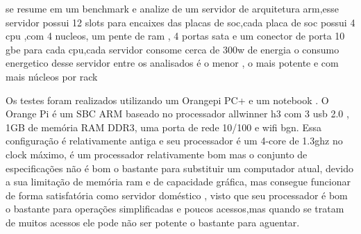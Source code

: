 \documentclass[
	12pt,				%
	openright,			%
	oneside,			%
	a4paper,			%
	english,			%
	french,				%
	spanish,			%
	brazil,				%
	]{abntex2}
\begin{document}
se resume em um benchmark e analize de um servidor de arquitetura arm,esse servidor possui 12 slots para encaixes das placas de soc,cada placa de soc possui 4 cpu ,com 4 nucleos, um pente de ram ,
4 portas sata e um conector de porta 10 gbe para cada cpu,cada servidor consome cerca de 300w de energia
o consumo energetico desse servidor entre os analisados é o menor , o mais potente e com mais núcleos por rack
\cite{hs06}

Os testes foram realizados utilizando um Orangepi PC+ \cite{opipc} e um notebook .
O Orange Pi é um SBC ARM baseado no processador allwinner h3 \cite{h3} com 3 usb 2.0 ,
1GB de memória RAM DDR3, uma porta de rede 10/100 e wifi bgn. Essa configuração é relativamente antiga e seu processador é um 4-core de 1.3ghz no clock máximo,
é um processador relativamente bom mas o conjunto de especificações não é bom o bastante para substituir um computador atual,
devido a sua limitação de memória ram e de capacidade gráfica, mas consegue funcionar de forma satisfatória como servidor doméstico ,
visto que seu processador é bom o bastante para operações simplificadas e poucos acessos,mas quando se tratam de muitos acessos ele pode não ser potente o bastante para aguentar.
\end{document}

